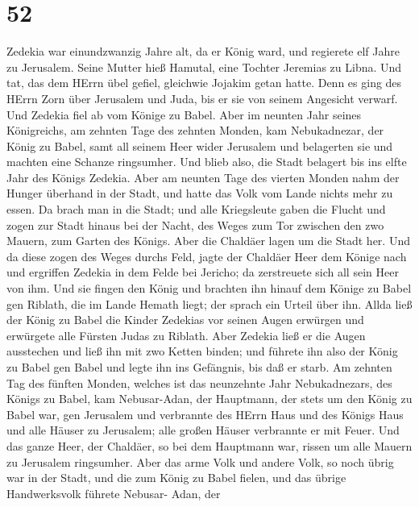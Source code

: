 \hypertarget{section-51}{%
\section{52}\label{section-51}}

 Zedekia war einundzwanzig Jahre alt, da er König ward, und
regierete elf Jahre zu Jerusalem. Seine Mutter hieß Hamutal, eine
Tochter Jeremias zu Libna.  Und tat, das dem HErrn übel
gefiel, gleichwie Jojakim getan hatte.  Denn es ging des
HErrn Zorn über Jerusalem und Juda, bis er sie von seinem Angesicht
verwarf. Und Zedekia fiel ab vom Könige zu Babel.  Aber im
neunten Jahr seines Königreichs, am zehnten Tage des zehnten Monden, kam
Nebukadnezar, der König zu Babel, samt all seinem Heer wider Jerusalem
und belagerten sie und machten eine Schanze ringsumher.  Und
blieb also, die Stadt belagert bis ins elfte Jahr des Königs Zedekia.
 Aber am neunten Tage des vierten Monden nahm der Hunger
überhand in der Stadt, und hatte das Volk vom Lande nichts mehr zu
essen.  Da brach man in die Stadt; und alle Kriegsleute
gaben die Flucht und zogen zur Stadt hinaus bei der Nacht, des Weges zum
Tor zwischen den zwo Mauern, zum Garten des Königs. Aber die Chaldäer
lagen um die Stadt her.  Und da diese zogen des Weges durchs
Feld, jagte der Chaldäer Heer dem Könige nach und ergriffen Zedekia in
dem Felde bei Jericho; da zerstreuete sich all sein Heer von ihm.
 Und sie fingen den König und brachten ihn hinauf dem Könige
zu Babel gen Riblath, die im Lande Hemath liegt; der sprach ein Urteil
über ihn.  Allda ließ der König zu Babel die Kinder
Zedekias vor seinen Augen erwürgen und erwürgete alle Fürsten Judas zu
Riblath.  Aber Zedekia ließ er die Augen ausstechen und
ließ ihn mit zwo Ketten binden; und führete ihn also der König zu Babel
gen Babel und legte ihn ins Gefängnis, bis daß er starb. 
Am zehnten Tag des fünften Monden, welches ist das neunzehnte Jahr
Nebukadnezars, des Königs zu Babel, kam Nebusar-Adan, der Hauptmann, der
stets um den König zu Babel war, gen Jerusalem  und
verbrannte des HErrn Haus und des Königs Haus und alle Häuser zu
Jerusalem; alle großen Häuser verbrannte er mit Feuer.  Und
das ganze Heer, der Chaldäer, so bei dem Hauptmann war, rissen um alle
Mauern zu Jerusalem ringsumher.  Aber das arme Volk und
andere Volk, so noch übrig war in der Stadt, und die zum König zu Babel
fielen, und das übrige Handwerksvolk führete Nebusar- Adan, der
